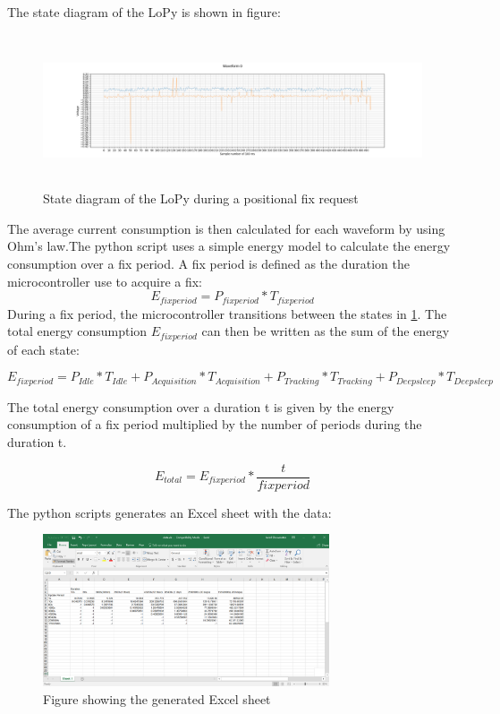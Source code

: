  
 The state diagram of the LoPy is shown in figure:
\begin{figure}[H]
\centering
\includegraphics[height=4.5cm]{Project_Report/Images/pythonwaveform.png}
\caption{State diagram of the LoPy during a positional fix request}
\label{fig:LoPystate}
\end{figure}


 
 
 The average current consumption is then calculated for each waveform by using Ohm's law.The python script uses a simple energy model to calculate the energy consumption over a fix period. A fix period is defined as the duration the microcontroller use to acquire a fix:
\begin{equation}
E_{fixperiod} = P_{fixperiod}*T_{fixperiod}
\end{equation}
During a fix period, the microcontroller transitions between the states in \ref{fig:LoPystate}. The total energy consumption $E_{fixperiod}$ can then be written as the sum of the energy of each state:

\begin{equation}
E_{fixperiod} = P_{Idle}*T_{Idle} + P_{Acquisition}*T_{Acquisition} + P_{Tracking}*T_{Tracking} + P_{Deepsleep}*T_{Deepsleep}
\end{equation}

The total energy consumption over a duration t is given by the energy consumption of a fix period multiplied by the number of periods during the duration t.

\begin{equation}
 E_{total} = E_{fixperiod}* \frac{t}{fixperiod}
\end{equation}

The python scripts generates an Excel sheet with the data:

\begin{figure}[H]
\centering
\includegraphics[height=4.5cm]{Project_Report/Images/Excel_sample.PNG}
\caption{Figure showing the generated Excel sheet}
\label{fig:Excelsample}
\end{figure}


